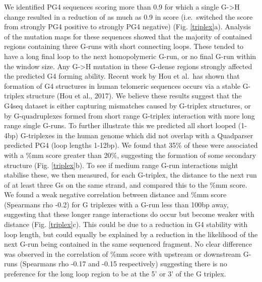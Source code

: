 \documentclass[12pt,a4paper,]{report}
\begin{document}
We identified PG4 sequences scoring more than 0.9 for which a single
G-\textgreater{}H change resulted in a reduction of as much as 0.9 in
score (i.e.~switched the score from strongly PG4 positive to strongly
PG4 negative) (Fig. \ref{triplex}a). Analysis of the mutation maps for
these sequences showed that the majority of contained regions containing
three G-runs with short connecting loops. These tended to have a long
final loop to the next homopolymeric G-run, or no final G-run within the
window size. Any G-\textgreater{}H mutation in these G-dense regions
strongly affected the predicted G4 forming ability. Recent work by Hou
et al.~has shown that formation of G4 structures in human telomeric
sequences occurs via a stable G-triplex structure (Hou et al., 2017). We
believe these results suggest that the G4seq dataset is either capturing
mismatches caused by G-triplex structures, or by G-quadruplexes formed
from short range G-triplex interaction with more long range single
G-runs. To further illustrate this we predicted all short looped (1-4bp)
G-triplexes in the human genome which did not overlap with a Quadparser
predicted PG4 (loop lengths 1-12bp). We found that 35\% of these were
associated with a \%mm score greater than 20\%, suggesting the formation
of some secondary structure (Fig. \ref{triplex}b). To see if medium
range G-run interactions might stabilise these, we then measured, for
each G-triplex, the distance to the next run of at least three Gs on the
same strand, and compared this to the \%mm score. We found a weak
negative correlation between distance and \%mm score (Spearmans rho
-0.2) for G triplexes with a G-run less than 100bp away, suggesting that
these longer range interactions do occur but become weaker with distance
(Fig. \ref{triplex}c). This could be due to a reduction in G4 stability
with loop length, but could equally be explained by a reduction in the
likelihood of the next G-run being contained in the same sequenced
fragment. No clear difference was observed in the correlation of \%mm
score with upstream or downstream G-runs (Spearmans rho -0.17 and -0.15
respectively) suggesting there is no preference for the long loop region
to be at the 5' or 3' of the G triplex.

\newpage
\end{document}
